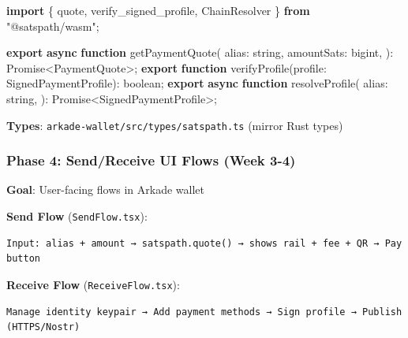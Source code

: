 \documentclass[
]{article}
\newenvironment{Shaded}{}{}
\newcommand{\BuiltInTok}[1]{\textcolor[rgb]{0.00,0.50,0.00}{#1}}
\newcommand{\DataTypeTok}[1]{\textcolor[rgb]{0.56,0.13,0.00}{#1}}
\newcommand{\FunctionTok}[1]{\textcolor[rgb]{0.02,0.16,0.49}{#1}}
\newcommand{\ImportTok}[1]{\textcolor[rgb]{0.00,0.50,0.00}{\textbf{#1}}}
\newcommand{\KeywordTok}[1]{\textcolor[rgb]{0.00,0.44,0.13}{\textbf{#1}}}
\newcommand{\NormalTok}[1]{#1}
\newcommand{\OperatorTok}[1]{\textcolor[rgb]{0.40,0.40,0.40}{#1}}
\newcommand{\StringTok}[1]{\textcolor[rgb]{0.25,0.44,0.63}{#1}}
\begin{document}
\begin{Shaded}
\begin{Highlighting}[]
\ImportTok{import}\NormalTok{ \{ quote}\OperatorTok{,}\NormalTok{ verify\_signed\_profile}\OperatorTok{,}\NormalTok{ ChainResolver \} }\ImportTok{from} \StringTok{"@satspath/wasm"}\OperatorTok{;}

\ImportTok{export} \KeywordTok{async} \KeywordTok{function} \FunctionTok{getPaymentQuote}\NormalTok{(}
\NormalTok{  alias}\OperatorTok{:} \DataTypeTok{string}\OperatorTok{,}
\NormalTok{  amountSats}\OperatorTok{:} \DataTypeTok{bigint}\OperatorTok{,}
\NormalTok{)}\OperatorTok{:} \BuiltInTok{Promise}\OperatorTok{\textless{}}\NormalTok{PaymentQuote}\OperatorTok{\textgreater{};}
\ImportTok{export} \KeywordTok{function} \FunctionTok{verifyProfile}\NormalTok{(profile}\OperatorTok{:}\NormalTok{ SignedPaymentProfile)}\OperatorTok{:} \DataTypeTok{boolean}\OperatorTok{;}
\ImportTok{export} \KeywordTok{async} \KeywordTok{function} \FunctionTok{resolveProfile}\NormalTok{(}
\NormalTok{  alias}\OperatorTok{:} \DataTypeTok{string}\OperatorTok{,}
\NormalTok{)}\OperatorTok{:} \BuiltInTok{Promise}\OperatorTok{\textless{}}\NormalTok{SignedPaymentProfile}\OperatorTok{\textgreater{};}
\end{Highlighting}
\end{Shaded}

\textbf{Types}: \texttt{arkade-wallet/src/types/satspath.ts} (mirror
Rust types)

\hypertarget{phase-4-sendreceive-ui-flows-week-3-4}{%
\subsubsection{Phase 4: Send/Receive UI Flows (Week
3-4)}\label{phase-4-sendreceive-ui-flows-week-3-4}}

\textbf{Goal}: User-facing flows in Arkade wallet

\textbf{Send Flow} (\texttt{SendFlow.tsx}):

\begin{verbatim}
Input: alias + amount → satspath.quote() → shows rail + fee + QR → Pay button
\end{verbatim}

\textbf{Receive Flow} (\texttt{ReceiveFlow.tsx}):

\begin{verbatim}
Manage identity keypair → Add payment methods → Sign profile → Publish (HTTPS/Nostr)
\end{verbatim}
\end{document}
